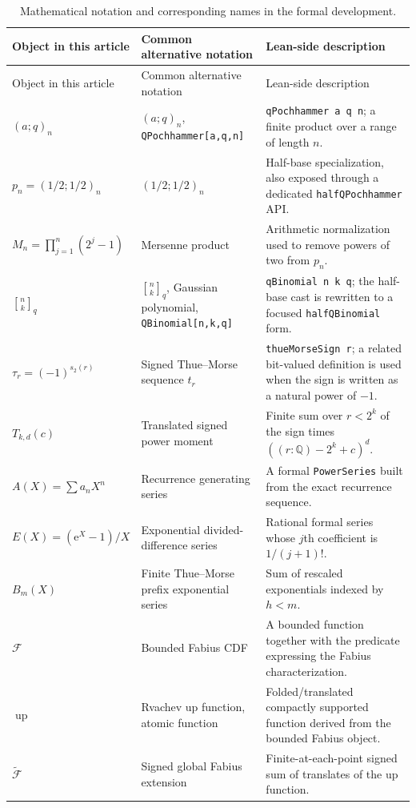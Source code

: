 \documentclass[11pt,oneside]{article}
\theoremstyle{definition}
\theoremstyle{remark}
\newcommand{\qpoch}[3]{\left(#1;#2\right)_{#3}}
\newcommand{\qbinom}[3]{{\genfrac{[}{]}{0pt}{}{#1}{#2}}_{#3}}
\newcommand{\F}{\mathcal F}
\newcommand{\G}{\widetilde{\mathcal F}}
\newcommand{\upfun}{\operatorname{up}}
\newcommand{\Q}{\mathbb Q}
\newcommand{\e}{\mathrm e}
\newcommand{\tm}{\tau}
\begin{document}
\begin{longtable}{@{}L{0.25\textwidth}L{0.25\textwidth}L{0.42\textwidth}@{}}
\caption{Mathematical notation and corresponding names in the formal development.}
\label{tab:notationcrosswalk}\\
\toprule
Object in this article & Common alternative notation & Lean-side description\\
\midrule
\endfirsthead
\toprule
Object in this article & Common alternative notation & Lean-side description\\
\midrule
\endhead
$\qpoch{a}{q}{n}$
& $(a;q)_n$, \texttt{QPochhammer[a,q,n]}
& \texttt{qPochhammer a q n}; a finite product over a range of length $n$.\\[0.35em]
$p_n=\qpoch{1/2}{1/2}{n}$
& $(1/2;1/2)_n$
& Half-base specialization, also exposed through a dedicated
\texttt{halfQPochhammer} API.\\[0.35em]
$M_n=\prod_{j=1}^{n}(2^j-1)$
& Mersenne product
& Arithmetic normalization used to remove powers of two from $p_n$.\\[0.35em]
$\qbinom{n}{k}{q}$
& $\qbinom{n}{k}{q}$, Gaussian polynomial, \texttt{QBinomial[n,k,q]}
& \texttt{qBinomial n k q}; the half-base cast is rewritten to a focused
\texttt{halfQBinomial} form.\\[0.35em]
$\tm_r=(-1)^{s_2(r)}$
& Signed Thue--Morse sequence $t_r$
& \texttt{thueMorseSign r}; a related bit-valued definition is used when the
sign is written as a natural power of $-1$.\\[0.35em]
$T_{k,d}(c)$
& Translated signed power moment
& Finite sum over $r<2^k$ of the sign times
$((r:\Q)-2^k+c)^d$.\\[0.35em]
$A(X)=\sum a_nX^n$
& Recurrence generating series
& A formal \texttt{PowerSeries} built from the exact recurrence sequence.\\[0.35em]
$E(X)=(\e^X-1)/X$
& Exponential divided-difference series
& Rational formal series whose $j$th coefficient is $1/(j+1)!$.\\[0.35em]
$B_m(X)$
& Finite Thue--Morse prefix exponential series
& Sum of rescaled exponentials indexed by $h<m$.\\[0.35em]
$\F$
& Bounded Fabius CDF
& A bounded function together with the predicate expressing the Fabius
characterization.\\[0.35em]
$\upfun$
& Rvachev up function, atomic function
& Folded/translated compactly supported function derived from the bounded
Fabius object.\\[0.35em]
$\G$
& Signed global Fabius extension
& Finite-at-each-point signed sum of translates of the up function.\\
\bottomrule
\end{longtable}
\end{document}
